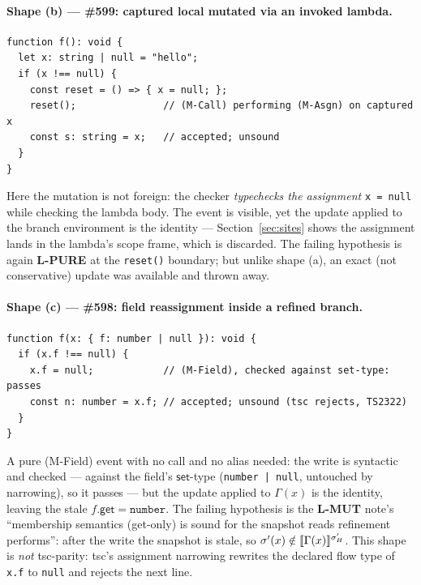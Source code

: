\documentclass[11pt]{article}
\newcommand{\Env}{\Gamma}
\begin{document}
\paragraph{Shape (b) — \#599: captured local mutated via an invoked lambda.}
\begin{verbatim}
function f(): void {
  let x: string | null = "hello";
  if (x !== null) {
    const reset = () => { x = null; };
    reset();               // (M-Call) performing (M-Asgn) on captured x
    const s: string = x;   // accepted; unsound
  }
}
\end{verbatim}
Here the mutation is not foreign: the checker \emph{typechecks the
assignment} \texttt{x = null} while checking the lambda body. The event
is visible, yet the update applied to the branch environment is the
identity — Section~\ref{sec:sites} shows the assignment lands in the
lambda's scope frame, which is discarded. The failing hypothesis is again
\textbf{L-PURE} at the \texttt{reset()} boundary; but unlike shape (a),
an exact (not conservative) update was available and thrown away.

\paragraph{Shape (c) — \#598: field reassignment inside a refined branch.}
\begin{verbatim}
function f(x: { f: number | null }): void {
  if (x.f !== null) {
    x.f = null;            // (M-Field), checked against set-type: passes
    const n: number = x.f; // accepted; unsound (tsc rejects, TS2322)
  }
}
\end{verbatim}
A pure (M-Field) event with no call and no alias needed: the write is
syntactic and checked — against the field's $\mathsf{set}$-type
(\texttt{number | null}, untouched by narrowing), so it passes — but the
update applied to $\Env(x)$ is the identity, leaving the stale
$f.\mathsf{get} = \texttt{number}$. The failing hypothesis is the
\textbf{L-MUT} note's ``membership semantics (get-only) is sound for the
snapshot reads refinement performs'': after the write the snapshot is
stale, so $\sigma'(x) \notin \sem{\Env(x)}^{\sigma'_H}$. This shape is
\emph{not} tsc-parity: tsc's assignment narrowing rewrites the declared
flow type of \texttt{x.f} to \texttt{null} and rejects the next line.

\end{document}
